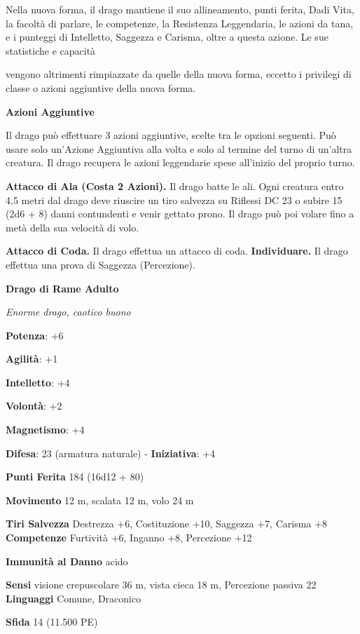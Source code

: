 \begin{multicols}{2}
Nella nuova forma, il drago mantiene il suo allineamento, punti ferita,
Dadi Vita, la facoltà di parlare, le competenze, la Resistenza
Leggendaria, le azioni da tana, e i punteggi di Intelletto, Saggezza e
Carisma, oltre a questa azione. Le sue statistiche e capacità

vengono altrimenti rimpiazzate da quelle della nuova forma, eccetto i
privilegi di classe o azioni aggiuntive della nuova forma.

\textbf{Azioni Aggiuntive}

Il drago può effettuare 3 azioni aggiuntive, scelte tra le opzioni
seguenti. Può usare solo un'Azione Aggiuntiva alla volta e solo al
termine del turno di un'altra creatura. Il drago recupera le azioni
leggendarie spese all'inizio del proprio turno.

\textbf{Attacco di Ala (Costa 2 Azioni).} Il drago batte le ali. Ogni
creatura entro 4,5 metri dal drago deve riuscire un tiro salvezza su Riflessi DC 23 o subire 15 (2d6 + 8) danni contundenti e venir gettato
prono. Il drago può poi volare fino a metà della sua velocità di volo.

\textbf{Attacco di Coda.} Il drago effettua un attacco di coda.
\textbf{Individuare.} Il drago effettua una prova di Saggezza
(Percezione).



\textbf{Drago di Rame Adulto}

\emph{Enorme drago, caotico buono}

\textbf{Potenza}: +6

\textbf{Agilità}: +1

\textbf{Intelletto}: +4

\textbf{Volontà}: +2

\textbf{Magnetismo}: +4

\textbf{Difesa}: 23 (armatura naturale) - \textbf{Iniziativa}: +4

\textbf{Punti Ferita} 184 (16d12 + 80)

\textbf{Movimento} 12 m, scalata 12 m, volo 24 m

\textbf{Tiri Salvezza} Destrezza +6, Costituzione +10, Saggezza +7,
Carisma +8 \textbf{Competenze} Furtività +6, Inganno +8, Percezione +12

\textbf{Immunità al Danno} acido

\textbf{Sensi} visione crepuscolare 36 m, vista cieca 18 m, Percezione passiva
22 \textbf{Linguaggi} Comune, Draconico

\textbf{Sfida} 14 (11.500 PE)


\end{multicols}
